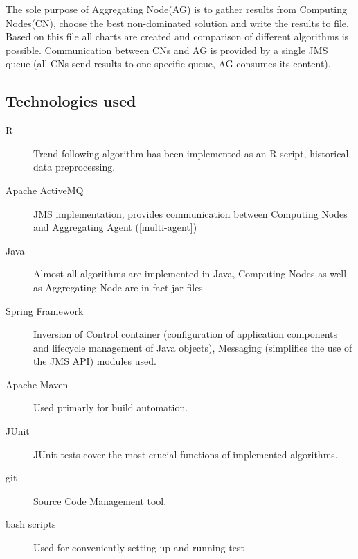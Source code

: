 The sole purpose of Aggregating Node(AG) is to gather results from Computing Nodes(CN), choose the best non-dominated solution and write the results to file. 
Based on this file all charts are created and comparison of different algorithms is possible.
Communication between CNs and AG is provided by a single JMS queue (all CNs send results to one specific queue, AG consumes its content).


\subsection{Technologies used}

\begin{description}
  \item [R]
      Trend following algorithm has been implemented as an R script, historical data preprocessing.
  \item [Apache ActiveMQ]
      JMS implementation, provides communication between Computing Nodes and Aggregating Agent (\ref{multi-agent})
  \item [Java]
      Almost all algorithms are implemented in Java, Computing Nodes as well as Aggregating Node are in fact jar files 
  \item [Spring Framework]
      Inversion of Control container (configuration of application components and lifecycle management of Java objects), Messaging (simplifies the use of the JMS API) modules used.
  \item [Apache Maven]
      Used primarly for build automation.
  \item [JUnit]
      JUnit tests cover the most crucial functions of implemented algorithms.
  \item [git]
      Source Code Management tool.
  \item [bash scripts]
      Used for conveniently setting up and running test 
\end{description}

 